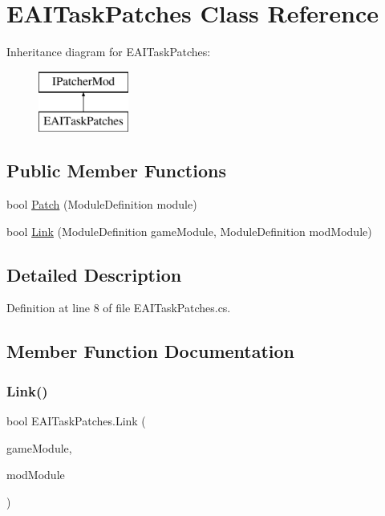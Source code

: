 \hypertarget{class_e_a_i_task_patches}{}\section{E\+A\+I\+Task\+Patches Class Reference}
\label{class_e_a_i_task_patches}
Inheritance diagram for E\+A\+I\+Task\+Patches\+:\begin{figure}[H]
\begin{center}
\leavevmode
\includegraphics[height=2.000000cm]{class_e_a_i_task_patches}
\end{center}
\end{figure}
\subsection*{Public Member Functions}
\begin{DoxyCompactItemize}
\item 
bool \mbox{\hyperlink{class_e_a_i_task_patches_a4ea2b64e82ea53f968647c054eaa79a1}{Patch}} (Module\+Definition module)
\item 
bool \mbox{\hyperlink{class_e_a_i_task_patches_aec9d31ae76740873a426d179f4bfa5b0}{Link}} (Module\+Definition game\+Module, Module\+Definition mod\+Module)
\end{DoxyCompactItemize}


\subsection{Detailed Description}


Definition at line 8 of file E\+A\+I\+Task\+Patches.\+cs.



\subsection{Member Function Documentation}
\mbox{\label{class_e_a_i_task_patches_aec9d31ae76740873a426d179f4bfa5b0}} 
\subsubsection{\texorpdfstring{Link()}{Link()}}
{\footnotesize\ttfamily bool E\+A\+I\+Task\+Patches.\+Link (\begin{DoxyParamCaption}\item[{Module\+Definition}]{game\+Module,  }\item[{Module\+Definition}]{mod\+Module }\end{DoxyParamCaption})}



